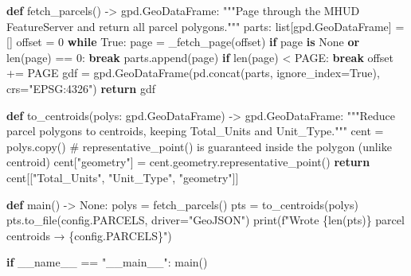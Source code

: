 \documentclass[
  letterpaper,
  DIV=11,
  numbers=noendperiod]{scrreprt}
\newenvironment{Shaded}{\begin{snugshade}}{\end{snugshade}}
\newcommand{\BuiltInTok}[1]{\textcolor[rgb]{0.00,0.23,0.31}{#1}}
\newcommand{\CommentTok}[1]{\textcolor[rgb]{0.37,0.37,0.37}{#1}}
\newcommand{\ControlFlowTok}[1]{\textcolor[rgb]{0.00,0.23,0.31}{\textbf{#1}}}
\newcommand{\DecValTok}[1]{\textcolor[rgb]{0.68,0.00,0.00}{#1}}
\newcommand{\KeywordTok}[1]{\textcolor[rgb]{0.00,0.23,0.31}{\textbf{#1}}}
\newcommand{\NormalTok}[1]{\textcolor[rgb]{0.00,0.23,0.31}{#1}}
\newcommand{\OperatorTok}[1]{\textcolor[rgb]{0.37,0.37,0.37}{#1}}
\newcommand{\SpecialCharTok}[1]{\textcolor[rgb]{0.37,0.37,0.37}{#1}}
\newcommand{\SpecialStringTok}[1]{\textcolor[rgb]{0.13,0.47,0.30}{#1}}
\newcommand{\StringTok}[1]{\textcolor[rgb]{0.13,0.47,0.30}{#1}}
\newcommand{\VariableTok}[1]{\textcolor[rgb]{0.07,0.07,0.07}{#1}}
\begin{document}
\begin{Shaded}
\begin{Highlighting}[]
\KeywordTok{def}\NormalTok{ fetch\_parcels() }\OperatorTok{{-}\textgreater{}}\NormalTok{ gpd.GeoDataFrame:}
    \CommentTok{"""Page through the MHUD FeatureServer and return all parcel polygons."""}
\NormalTok{    parts: }\BuiltInTok{list}\NormalTok{[gpd.GeoDataFrame] }\OperatorTok{=}\NormalTok{ []}
\NormalTok{    offset }\OperatorTok{=} \DecValTok{0}
    \ControlFlowTok{while} \VariableTok{True}\NormalTok{:}
\NormalTok{        page }\OperatorTok{=}\NormalTok{ \_fetch\_page(offset)}
        \ControlFlowTok{if}\NormalTok{ page }\KeywordTok{is} \VariableTok{None} \KeywordTok{or} \BuiltInTok{len}\NormalTok{(page) }\OperatorTok{==} \DecValTok{0}\NormalTok{:}
            \ControlFlowTok{break}
\NormalTok{        parts.append(page)}
        \ControlFlowTok{if} \BuiltInTok{len}\NormalTok{(page) }\OperatorTok{\textless{}}\NormalTok{ PAGE:}
            \ControlFlowTok{break}
\NormalTok{        offset }\OperatorTok{+=}\NormalTok{ PAGE}
\NormalTok{    gdf }\OperatorTok{=}\NormalTok{ gpd.GeoDataFrame(pd.concat(parts, ignore\_index}\OperatorTok{=}\VariableTok{True}\NormalTok{), crs}\OperatorTok{=}\StringTok{"EPSG:4326"}\NormalTok{)}
    \ControlFlowTok{return}\NormalTok{ gdf}


\KeywordTok{def}\NormalTok{ to\_centroids(polys: gpd.GeoDataFrame) }\OperatorTok{{-}\textgreater{}}\NormalTok{ gpd.GeoDataFrame:}
    \CommentTok{"""Reduce parcel polygons to centroids, keeping Total\_Units and Unit\_Type."""}
\NormalTok{    cent }\OperatorTok{=}\NormalTok{ polys.copy()}
    \CommentTok{\# representative\_point() is guaranteed inside the polygon (unlike centroid)}
\NormalTok{    cent[}\StringTok{"geometry"}\NormalTok{] }\OperatorTok{=}\NormalTok{ cent.geometry.representative\_point()}
    \ControlFlowTok{return}\NormalTok{ cent[[}\StringTok{"Total\_Units"}\NormalTok{, }\StringTok{"Unit\_Type"}\NormalTok{, }\StringTok{"geometry"}\NormalTok{]]}


\KeywordTok{def}\NormalTok{ main() }\OperatorTok{{-}\textgreater{}} \VariableTok{None}\NormalTok{:}
\NormalTok{    polys }\OperatorTok{=}\NormalTok{ fetch\_parcels()}
\NormalTok{    pts }\OperatorTok{=}\NormalTok{ to\_centroids(polys)}
\NormalTok{    pts.to\_file(config.PARCELS, driver}\OperatorTok{=}\StringTok{"GeoJSON"}\NormalTok{)}
    \BuiltInTok{print}\NormalTok{(}\SpecialStringTok{f"Wrote }\SpecialCharTok{\{}\BuiltInTok{len}\NormalTok{(pts)}\SpecialCharTok{\}}\SpecialStringTok{ parcel centroids → }\SpecialCharTok{\{}\NormalTok{config}\SpecialCharTok{.}\NormalTok{PARCELS}\SpecialCharTok{\}}\SpecialStringTok{"}\NormalTok{)}


\ControlFlowTok{if} \VariableTok{\_\_name\_\_} \OperatorTok{==} \StringTok{"\_\_main\_\_"}\NormalTok{:}
\NormalTok{    main()}
\end{Highlighting}
\end{Shaded}
\end{document}
